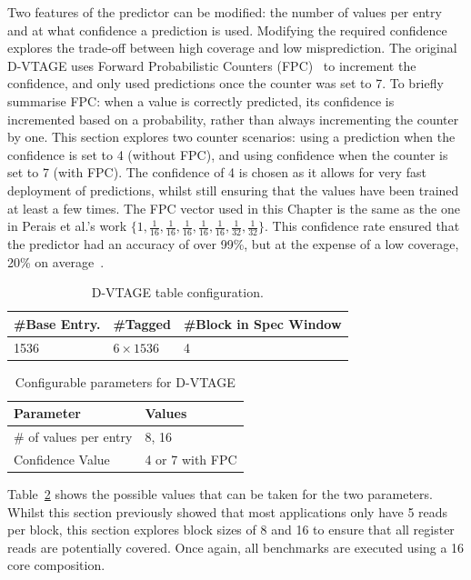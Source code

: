 Two features of the predictor can be modified: the number of values per entry and at what confidence a prediction is used.
Modifying the required confidence explores the trade-off between high coverage and low misprediction.
The original D-VTAGE uses Forward Probabilistic Counters (FPC)~\cite{riley2006fpc} to increment the confidence, and only used predictions once the counter was set to 7.
To briefly summarise FPC: when a value is correctly predicted, its confidence is incremented based on a probability, rather than always incrementing the counter by one.
This section explores two counter scenarios: using a prediction when the confidence is set to 4 (without FPC), and using confidence when the counter is set to 7 (with FPC).
The confidence of 4 is chosen as it allows for very fast deployment of predictions, whilst still ensuring that the values have been trained at least a few times.
The FPC vector used in this Chapter is the same as the one in Perais et al.'s work $\{1,\frac{1}{16},\frac{1}{16},\frac{1}{16},\frac{1}{16},\frac{1}{16},\frac{1}{32},\frac{1}{32}\}$.
This confidence rate ensured that the predictor had an accuracy of over 99\%, but at the expense of a low coverage, 20\% on average~\cite{peraisBeBop2015}.


\begin{table}[t]
  \small
  \centering
 \begin{tabular} {| l | l | l |}
 \hline
	\#Base Entry. & \#Tagged & \#Block in Spec Window\\ \hline
	1536 & $6\times1536$ & 4 \\ \hline
	\end{tabular}
  \caption{D-VTAGE table configuration.}\label{tab:vtage-conf}
\end{table}

\begin{table}[t]
\small
\centering
\begin{tabular}{p{5.2cm} p{1.8cm}}
\toprule
\textbf{Parameter} & \textbf{Values} \\ \midrule
\# of values per entry & 8, 16\\
Confidence Value & 4 or 7 with FPC \\ \bottomrule
\end{tabular}
\caption{Configurable parameters for D-VTAGE}\label{tab:vtage-params}
\vspace{1em}
\end{table}

Table~\ref{tab:vtage-params} shows the possible values that can be taken for the two parameters.
Whilst this section previously showed that most applications only have 5 reads per block, this section explores block sizes of 8 and 16 to ensure that all register reads are potentially covered. 
Once again, all benchmarks are executed using a 16 core composition.

